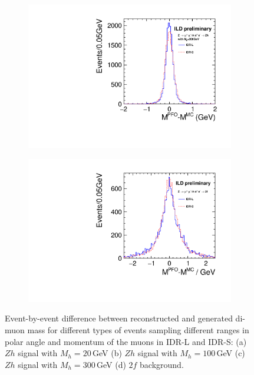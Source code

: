 \begin{figure}[htbp]
\begin{subfigure}{0.475\hsize}
\includegraphics[width=\textwidth]{Performance/fig/lepton_pair_inm_difference_nh300.pdf}
 \caption{ \label{fig:extraH:Mdiff:mh300}}
 \end{subfigure}
\begin{subfigure}{0.475\hsize} 
\includegraphics[width=\textwidth]{Performance/fig/lepton_pair_inm_difference_2f.pdf}
 \caption{  \label{fig:extraH:Mdiff:2f}}
 \end{subfigure}
\caption{Event-by-event difference between reconstructed and generated di-muon mass for different types of events sampling different ranges in polar angle and momentum of the muons  in IDR-L and IDR-S:
(a) $Zh$ signal with $M_h = 20$\,GeV
(b) $Zh$ signal with $M_h = 100$\,GeV
(c) $Zh$ signal with $M_h = 300$\,GeV
(d) $2f$ background.
}
\label{fig:extraH:Mdiff}
\end{figure}

